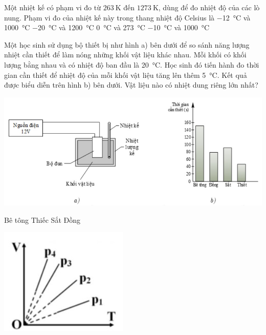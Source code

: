 \begin{ex}
	Một nhiệt kế có phạm vi đo từ $\SI{263}{\kelvin}$ đến $\SI{1273}{\kelvin}$, dùng để đo nhiệt độ của các lò nung. Phạm vi đo của nhiệt kế này trong thang nhiệt độ Celsius là
	\choice
	{\SI{-12}{\celsius} và \SI{1000}{\celsius}}
	{\SI{-20}{\celsius} và \SI{1200}{\celsius}}
	{\SI{0}{\celsius} và \SI{273}{\celsius}}
	{\True \SI{-10}{\celsius} và \SI{1000}{\celsius}}
	\loigiai{}
\end{ex}
\begin{ex}
	Một học sinh sử dụng bộ thiết bị như hình a) bên dưới để so sánh năng lượng nhiệt cần thiết để làm nóng những khối vật liệu khác nhau. Mỗi khối có khối lượng bằng nhau và có nhiệt độ ban đầu là \SI{20}{\celsius}. Học sinh đó tiến hành đo thời gian cần thiết để nhiệt độ của mỗi khối vật liệu tăng lên thêm \SI{5}{\celsius}. Kết quả được biểu diễn trên hình b) bên dưới. Vật liệu nào có nhiệt dung riêng lớn nhất?
	\begin{center}
		\includegraphics[scale=0.8]{../figs/Y24-VN12-PH-C2-BT-2}
	\end{center}
	\choice
	{\True Bê tông}
	{Thiếc}
	{Sắt}
	{Đồng}
	\loigiai{}
\end{ex}
\begin{ex}
		{\vspace{-0.75cm}\includegraphics[scale=0.7]{../figs/Y24-VN12-PH-C2-BT-3}}
	\loigiai{}
\end{ex}
